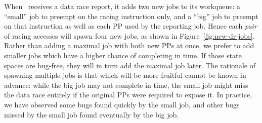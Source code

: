 
When \quicksand~receives a data race report, it adds two new jobs to its workqueue:
a ``small'' job to preempt on the racing instruction only,
and a ``big'' job to preempt on that instruction as well as each PP used by the reporting job.
%
Hence each {\em pair} of racing accesses will spawn four new jobs, as shown in Figure~\ref{fig:new-dr-jobs}.
Rather than adding a maximal job with both new PPs at once, we prefer to add smaller jobs which have a higher chance of completing in time.
If those state spaces are bug-free, they will in turn add the maximal job later.
%
The rationale of spawning multiple jobs is that which will be more fruitful cannot be known in advance: while the big job may not complete in time, the small job might miss the data race entirely if the original PPs were required to expose it.
In practice, we have observed some bugs found quickly by the small job, and other bugs missed by the small job found eventually by the big job.




